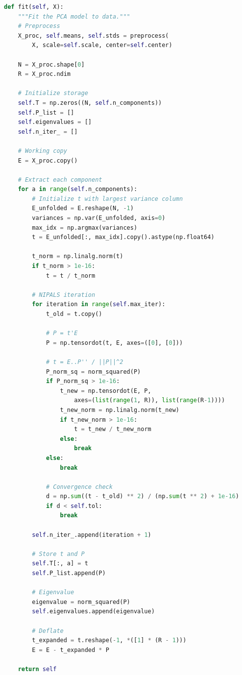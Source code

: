 \documentclass[12pt,a4paper]{article}
\begin{document}
\begin{lstlisting}[language=Python, basicstyle=\ttfamily\tiny, breaklines=true]
def fit(self, X):
    """Fit the PCA model to data."""
    # Preprocess
    X_proc, self.means, self.stds = preprocess(
        X, scale=self.scale, center=self.center)

    N = X_proc.shape[0]
    R = X_proc.ndim

    # Initialize storage
    self.T = np.zeros((N, self.n_components))
    self.P_list = []
    self.eigenvalues = []
    self.n_iter_ = []

    # Working copy
    E = X_proc.copy()

    # Extract each component
    for a in range(self.n_components):
        # Initialize t with largest variance column
        E_unfolded = E.reshape(N, -1)
        variances = np.var(E_unfolded, axis=0)
        max_idx = np.argmax(variances)
        t = E_unfolded[:, max_idx].copy().astype(np.float64)

        t_norm = np.linalg.norm(t)
        if t_norm > 1e-16:
            t = t / t_norm

        # NIPALS iteration
        for iteration in range(self.max_iter):
            t_old = t.copy()

            # P = t'E
            P = np.tensordot(t, E, axes=([0], [0]))

            # t = E..P'' / ||P||^2
            P_norm_sq = norm_squared(P)
            if P_norm_sq > 1e-16:
                t_new = np.tensordot(E, P,
                    axes=(list(range(1, R)), list(range(R-1))))
                t_new_norm = np.linalg.norm(t_new)
                if t_new_norm > 1e-16:
                    t = t_new / t_new_norm
                else:
                    break
            else:
                break

            # Convergence check
            d = np.sum((t - t_old) ** 2) / (np.sum(t ** 2) + 1e-16)
            if d < self.tol:
                break

        self.n_iter_.append(iteration + 1)

        # Store t and P
        self.T[:, a] = t
        self.P_list.append(P)

        # Eigenvalue
        eigenvalue = norm_squared(P)
        self.eigenvalues.append(eigenvalue)

        # Deflate
        t_expanded = t.reshape(-1, *([1] * (R - 1)))
        E = E - t_expanded * P

    return self
\end{lstlisting}
\end{document}
